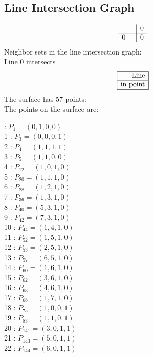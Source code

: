 \documentclass{article}
\begin{document}
{\subsection*{Line Intersection Graph}
{\arraycolsep=1pt
$$
\begin{array}{rr|*{1}r}
 &  & 0\\
\hline
0 &  & 0\\
\end{array}
$$
}%
Neighbor sets in the line intersection graph:\\
Line 0 intersects 
$$
\begin{array}{|r*{0}{|c}|}
\hline
\mbox{Line} \\
\hline
\mbox{in point} \\
\hline
\end{array}
$$
The surface has 57 points:\\
The points on the surface are:\\
\begin{multicols}{3}
 : $P_{1}=( 0, 1, 0, 0 )$\\
1 : $P_{3}=( 0, 0, 0, 1 )$\\
2 : $P_{4}=( 1, 1, 1, 1 )$\\
3 : $P_{5}=( 1, 1, 0, 0 )$\\
4 : $P_{12}=( 1, 0, 1, 0 )$\\
5 : $P_{20}=( 1, 1, 1, 0 )$\\
6 : $P_{28}=( 1, 2, 1, 0 )$\\
7 : $P_{36}=( 1, 3, 1, 0 )$\\
8 : $P_{40}=( 5, 3, 1, 0 )$\\
9 : $P_{42}=( 7, 3, 1, 0 )$\\
10 : $P_{44}=( 1, 4, 1, 0 )$\\
11 : $P_{52}=( 1, 5, 1, 0 )$\\
12 : $P_{53}=( 2, 5, 1, 0 )$\\
13 : $P_{57}=( 6, 5, 1, 0 )$\\
14 : $P_{60}=( 1, 6, 1, 0 )$\\
15 : $P_{62}=( 3, 6, 1, 0 )$\\
16 : $P_{63}=( 4, 6, 1, 0 )$\\
17 : $P_{68}=( 1, 7, 1, 0 )$\\
18 : $P_{75}=( 1, 0, 0, 1 )$\\
19 : $P_{83}=( 1, 1, 0, 1 )$\\
20 : $P_{141}=( 3, 0, 1, 1 )$\\
21 : $P_{143}=( 5, 0, 1, 1 )$\\
22 : $P_{144}=( 6, 0, 1, 1 )$\\

\end{multicols}}
\end{document}
